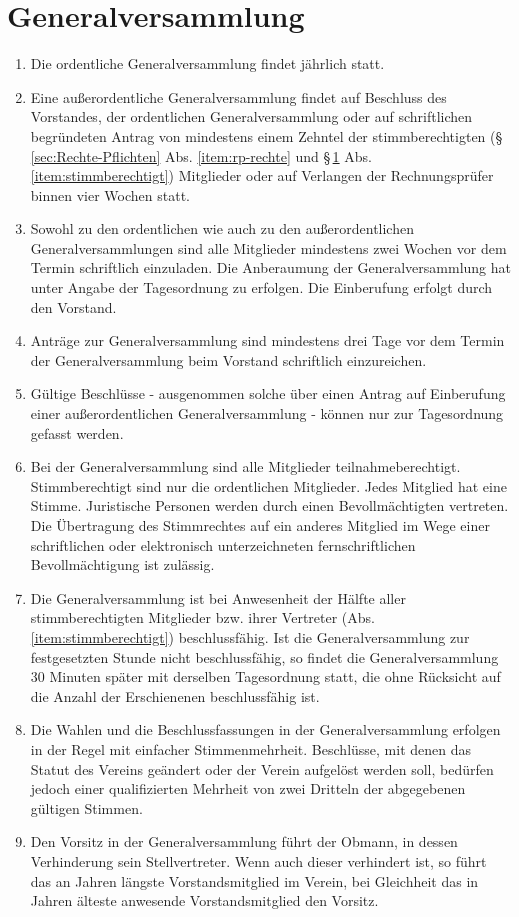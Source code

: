 \documentclass[a4paper,12pt]{article}
\begin{document}
\section{Generalversammlung} %
\label{sec:Generalversammlung}
\begin{enumerate}
\item\label{item:gv-ordentlich} Die ordentliche Generalversammlung findet jährlich statt.
\item\label{item:ev-ausserord} Eine außerordentliche Generalversammlung findet auf Beschluss des Vorstandes, der ordentlichen Generalversammlung oder auf schriftlichen begründeten Antrag von mindestens einem Zehntel der stimmberechtigten (§\,\ref{sec:Rechte-Pflichten} Abs. \ref{item:rp-rechte} und §\,\ref{sec:Generalversammlung} Abs. \ref{item:stimmberechtigt}) Mitglieder oder auf Verlangen der Rechnungsprüfer binnen vier Wochen statt.
\item Sowohl zu den ordentlichen wie auch zu den außerordentlichen Generalversammlungen sind alle Mitglieder mindestens zwei Wochen vor dem Termin schriftlich einzuladen. Die Anberaumung der Generalversammlung hat unter Angabe der Tagesordnung zu erfolgen. Die Einberufung erfolgt durch den Vorstand.
\item Anträge zur Generalversammlung sind mindestens drei Tage vor dem Termin der Generalversammlung beim Vorstand schriftlich einzureichen.
\item Gültige Beschlüsse - ausgenommen solche über einen Antrag auf Einberufung einer außerordentlichen Generalversammlung - können nur zur Tagesordnung gefasst werden.
\item\label{item:stimmberechtigt} Bei der Generalversammlung sind alle Mitglieder teilnahmeberechtigt. Stimmberechtigt sind nur die ordentlichen Mitglieder. Jedes Mitglied hat eine Stimme. Juristische Personen werden durch einen Bevollmächtigten vertreten. Die Übertragung des Stimmrechtes auf ein anderes Mitglied im Wege einer schriftlichen oder elektronisch unterzeichneten fernschriftlichen Bevollmächtigung ist zulässig.
\item Die Generalversammlung ist bei Anwesenheit der Hälfte aller stimmberechtigten Mitglieder bzw. ihrer Vertreter (Abs. \ref{item:stimmberechtigt}) beschlussfähig. Ist die Generalversammlung zur festgesetzten Stunde nicht beschlussfähig, so findet die Generalversammlung 30 Minuten später mit derselben Tagesordnung statt, die ohne Rücksicht auf die Anzahl der Erschienenen beschlussfähig ist.
\item Die Wahlen und die Beschlussfassungen in der Generalversammlung erfolgen in der Regel mit einfacher Stimmenmehrheit. Beschlüsse, mit denen das Statut des Vereins geändert oder der Verein aufgelöst werden soll, bedürfen jedoch einer qualifizierten Mehrheit von zwei Dritteln der abgegebenen gültigen Stimmen.
\item  Den Vorsitz in der Generalversammlung führt der Obmann, in dessen Verhinderung sein Stellvertreter. Wenn auch dieser verhindert ist, so führt das an Jahren längste Vorstandsmitglied im Verein, bei Gleichheit das in Jahren älteste anwesende Vorstandsmitglied den Vorsitz.
\end{enumerate}
\end{document}
